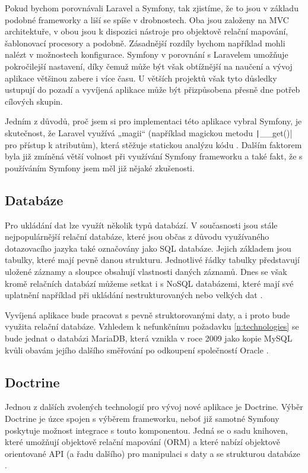 Pokud bychom porovnávali Laravel a Symfony, tak zjistíme, že to jsou v základu podobné frameworky a liší se spíše v drobnostech. Oba jsou založeny na MVC architektuře, v obou jsou k dispozici nástroje pro objektově relační mapování, šablonovací procesory a podobně. Zásadnější rozdíly bychom například mohli nalézt v možnostech konfigurace. Symfony v porovnání s Laravelem umožňuje pokročilejší nastavení, díky čemuž může být však obtížnější na naučení a vývoj aplikace většinou zabere i více času. U větších projektů však tyto důsledky ustupují do pozadí a vyvíjená aplikace může být přizpůsobena přesně dne potřeb cílových skupin. \cite{symfony_laravel_comparison}

Jedním z důvodů, proč jsem si pro implementaci této aplikace vybral Symfony, je skutečnost, že Laravel využívá „magii“ (například magickou metodu \texttt|__get()| pro přístup k atributům), která stěžuje statickou analýzu kódu \cite{larastan}. Dalším faktorem byla již zmíněná větší volnost při využívání Symfony frameworku a také fakt, že s používáním Symfony jsem měl již nějaké zkušenosti.

\subsection{Databáze}
Pro ukládání dat lze využít několik typů databází. V současnosti jsou stále nejpopulárnější relační databáze, které jsou občas z důvodu využívaného dotazovacího jazyka také označovány jako SQL databáze. Jejich základem jsou tabulky, které mají pevně danou strukturu. Jednotlivé řádky tabulky  představují uložené záznamy a sloupce obsahují vlastnosti daných záznamů. \cite{databases} Dnes se však kromě relačních databází můžeme setkat i s NoSQL databázemi, které mají své uplatnění například při ukládání nestrukturovaných nebo velkých dat \cite{nosql}.

Vyvíjená aplikace bude pracovat s pevně struktorovanými daty, a i proto bude využita relační databáze. Vzhledem k nefunkčnímu požadavku \ref{n:technologies} se bude jednat o databázi MariaDB, která vznikla v roce 2009 jako kopie MySQL kvůli obavám jejího dalšího směřování po odkoupení společností Oracle \cite{mariadb}.

\subsection{Doctrine}
Jednou z dalších zvolených technologií pro vývoj nové aplikace je Doctrine. Výběr Doctrine je úzce spojen s výběrem frameworku, neboť již samotné Symfony poskytuje možnost integrace s touto komponentou. Jedná se o sadu knihoven, které umožňují objektově relační mapování (ORM) a které nabízí objektově orientované API (a řadu dalšího) pro manipulaci s daty a se strukturou databáze \cite{doctrine_orm, doctrine_dbal}.

